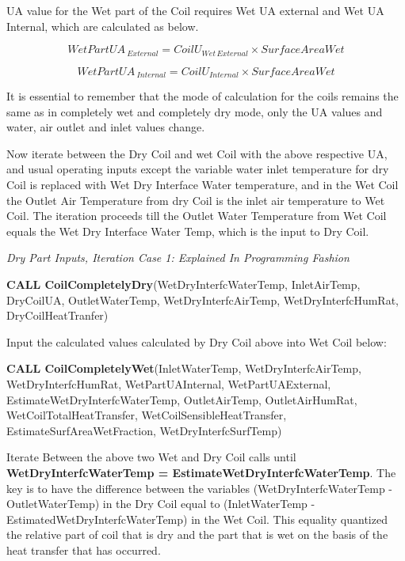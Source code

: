 UA value for the Wet part of the Coil requires Wet UA external and Wet UA Internal, which are calculated as below.

\begin{equation}
WetPartUA{\,_{External}} = Coil{U_{Wet\,External}} \times SurfaceAreaWet
\end{equation}

\begin{equation}
WetPartUA{\,_{Internal}} = Coil{U_{Internal}} \times SurfaceAreaWet
\end{equation}

It is essential to remember that the mode of calculation for the coils remains the same as in completely wet and completely dry mode, only the UA values and water, air outlet and inlet values change.

Now iterate between the Dry Coil and wet Coil with the above respective UA, and usual operating inputs except the variable water inlet temperature for dry Coil is replaced with Wet Dry Interface Water temperature, and in the Wet Coil the Outlet Air Temperature from dry Coil is the inlet air temperature to Wet Coil. The iteration proceeds till the Outlet Water Temperature from Wet Coil equals the Wet Dry Interface Water Temp, which is the input to Dry Coil.

\emph{Dry Part Inputs, Iteration Case 1: Explained In Programming Fashion}

\textbf{CALL CoilCompletelyDry}(WetDryInterfcWaterTemp, InletAirTemp, DryCoilUA, OutletWaterTemp, WetDryInterfcAirTemp, WetDryInterfcHumRat, DryCoilHeatTranfer)

Input the calculated values calculated by Dry Coil above into Wet Coil below:

\textbf{CALL CoilCompletelyWet}(InletWaterTemp, WetDryInterfcAirTemp, WetDryInterfcHumRat, WetPartUAInternal, WetPartUAExternal, EstimateWetDryInterfcWaterTemp, OutletAirTemp, OutletAirHumRat, WetCoilTotalHeatTransfer, WetCoilSensibleHeatTransfer, EstimateSurfAreaWetFraction, WetDryInterfcSurfTemp)

Iterate Between the above two Wet and Dry Coil calls until \textbf{WetDryInterfcWaterTemp = EstimateWetDryInterfcWaterTemp}. The key is to have the difference between the variables (WetDryInterfcWaterTemp - OutletWaterTemp) in the Dry Coil equal to (InletWaterTemp -EstimatedWetDryInterfcWaterTemp) in the Wet Coil. This equality quantized the relative part of coil that is dry and the part that is wet on the basis of the heat transfer that has occurred.


